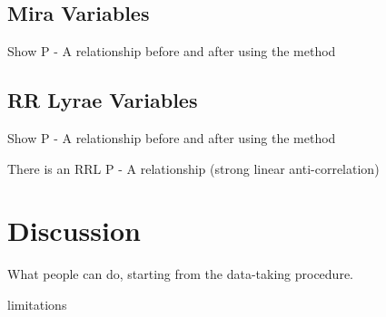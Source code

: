 \documentclass[12pt,preprint]{aastex}
\begin{document}
 \subsection{Mira Variables}

 Show P - A relationship before and after using the method



 \subsection{RR Lyrae Variables}

  Show P - A relationship before and after using the method

There is an RRL P - A relationship (strong linear anti-correlation)


\section{Discussion}
\label{sec:discussion}

What people can do, starting from the data-taking procedure.

limitations



\acknowledgements



\end{document}

